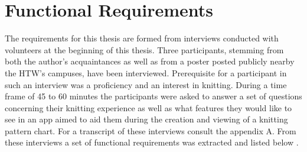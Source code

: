 \section{Functional Requirements}

The requirements for this thesis are formed from interviews conducted with volunteers at the beginning of this thesis. Three participants, stemming from both the author's acquaintances as well as from a poster posted publicly nearby the HTW’s campuses, have been interviewed. Prerequisite for a participant in such an interview was a proficiency and an interest in knitting. During a time frame of 45 to 60 minutes the participants were asked to answer a set of questions concerning their knitting experience as well as what features they would like to see in an app aimed to aid them during the creation and viewing of a knitting pattern chart. For a transcript of these interviews consult the appendix A. 
From these interviews a set of functional requirements was extracted and listed below .

